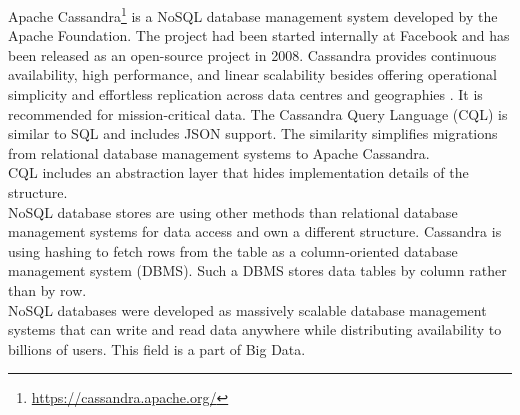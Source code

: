 Apache Cassandra\footnote{\url{https://cassandra.apache.org/}} is a NoSQL database management system developed by the Apache Foundation. The project had been started internally at Facebook and has been released as an open-source project in 2008. Cassandra provides continuous availability, high performance, and linear scalability besides  offering operational simplicity and effortless replication across data centres and geographies \cite{Datastax}. It is recommended for mission-critical data. The Cassandra Query Language (CQL) is similar to SQL and includes JSON support. The similarity simplifies migrations from relational database management systems to Apache Cassandra. \\ 
CQL includes an abstraction layer that hides implementation details of the structure.  \\
NoSQL database stores are using other methods than relational database management systems for data access and own a different structure. Cassandra is using hashing to fetch rows from the table as a column-oriented database management system (DBMS). Such a DBMS stores data tables by column rather than by row. \\ 
NoSQL databases were developed as massively scalable database management systems that can write and read data anywhere while distributing availability to billions of users. This field is a part of Big Data.